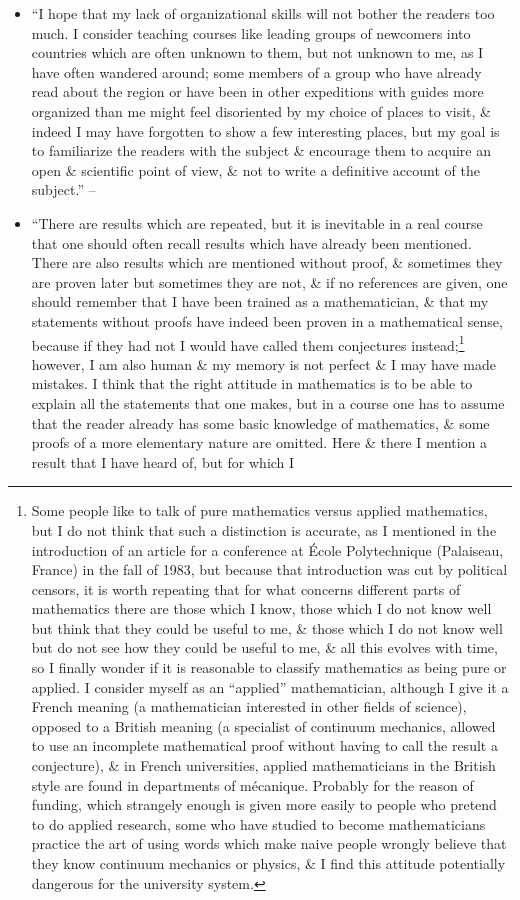 \documentclass{article}
\begin{document}
\begin{enumerate}
\begin{itemize}
		\item ``I hope that my lack of organizational skills will not bother the readers too much. I consider teaching courses like leading groups of newcomers into countries which are often unknown to them, but not unknown to me, as I have often wandered around; some members of a group who have already read about the region or have been in other expeditions with guides more organized than me might feel disoriented by my choice of places to visit, \& indeed I may have forgotten to show a few interesting places, but my goal is to familiarize the readers with the subject \& encourage them to acquire an open \& scientific point of view, \& not to write a definitive account of the subject.'' -- \cite[Preface, p. xii]{Tartar2006}
		\item ``There are results which are repeated, but it is inevitable in a real course that one should often recall results which have already been mentioned. There are also results which are mentioned without proof, \& sometimes they are proven later but sometimes they are not, \& if no references are given, one should remember that I have been trained as a mathematician, \& that my statements without proofs have indeed been proven in a mathematical sense, because if they had not I would have called them conjectures instead;\footnote{Some people like to talk of pure mathematics versus applied mathematics, but I do not think that such a distinction is accurate, as I mentioned in the introduction of an article for a conference at \'Ecole Polytechnique (Palaiseau, France) in the fall of 1983, but because that introduction was cut by political censors, it is worth repeating that for what concerns different parts of mathematics there are those which I know, those which I do not know well but think that they could be useful to me, \& those which I do not know well but do not see how they could be useful to me, \& all this evolves with time, so I finally wonder if it is reasonable to classify mathematics as being pure or applied. I consider myself as an ``applied'' mathematician, although I give it a French meaning (a mathematician interested in other fields of science), opposed to a British meaning (a specialist of continuum mechanics, allowed to use an incomplete mathematical proof without having to call the result a conjecture), \& in French universities, applied mathematicians in the British style are found in departments of m\'ecanique. Probably for the reason of funding, which strangely enough is given more easily to people who pretend to do applied research, some who have studied to become mathematicians practice the art of using words which make naive people wrongly believe that they know continuum mechanics or physics, \& I find this attitude potentially dangerous for the university system.} however, I am also human \& my memory is not perfect \& I may have made mistakes. I think that the right attitude in mathematics is to be able to explain all the statements that one makes, but in a course one has to assume that the reader already has some basic knowledge of mathematics, \& some proofs of a more elementary nature are omitted. Here \& there I mention a result that I have heard of, but for which I 
\end{itemize}
\end{enumerate}
\end{document}
